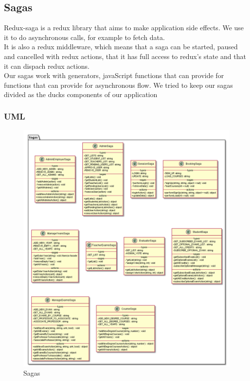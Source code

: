 
	\subsection{Sagas}
	Redux-saga is a redux library that aims to make application side effects. We use it to do asynchronous calls, for example to fetch data.\\
	It is also a redux middleware, which means that a saga can be started, paused and cancelled with redux actions, that it has full access to redux's state and that it can dispach redux actions.\\
	Our sagas work with generators, javaScript functions that can provide for functions that can provide for asynchronous flow. We tried to keep our sagas divided as the ducks components of our application
	\subsubsection{UML}
	\begin{figure}[H]
		\centering
		\includegraphics[width=1\linewidth]{"../diagrammi/redux/sagas"}
		\caption{Sagas}
		\label{fig:Sagas}
	\end{figure}

